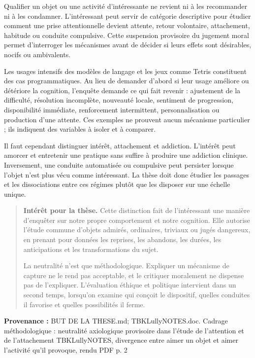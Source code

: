 \documentclass[10pt,a4paper]{article}
\begin{document}
Qualifier un objet ou une activité d'intéressante ne revient ni à les recommander ni à les condamner. L'intéressant peut servir de catégorie descriptive pour étudier comment une prise attentionnelle devient attente, retour volontaire, attachement, habitude ou conduite compulsive. Cette suspension provisoire du jugement moral permet d'interroger les mécanismes avant de décider si leurs effets sont désirables, nocifs ou ambivalents.

Les usages intensifs des modèles de langage et les jeux comme Tetris constituent des cas programmatiques. Au lieu de demander d'abord si leur usage améliore ou détériore la cognition, l'enquête demande ce qui fait revenir : ajustement de la difficulté, résolution incomplète, nouveauté locale, sentiment de progression, disponibilité immédiate, renforcement intermittent, personnalisation ou production d'une attente. Ces exemples ne prouvent aucun mécanisme particulier ; ils indiquent des variables à isoler et à comparer.

Il faut cependant distinguer intérêt, attachement et addiction. L'intérêt peut amorcer et entretenir une pratique sans suffire à produire une addiction clinique. Inversement, une conduite automatisée ou compulsive peut persister lorsque l'objet n'est plus vécu comme intéressant. La thèse doit donc étudier les passages et les dissociations entre ces régimes plutôt que les disposer sur une échelle unique.

\begin{quote}
\textbf{Intérêt pour la thèse.} Cette distinction fait de l'intéressant une manière d'enquêter sur notre propre comportement et notre cognition. Elle autorise l'étude commune d'objets admirés, ordinaires, triviaux ou jugés dangereux, en prenant pour données les reprises, les abandons, les durées, les anticipations et les transformations du sujet.

La neutralité n'est que méthodologique. Expliquer un mécanisme de capture ne le rend pas acceptable, et le critiquer moralement ne dispense pas de l'expliquer. L'évaluation éthique et politique intervient dans un second temps, lorsqu'on examine qui conçoit le dispositif, quelles conduites il favorise et quelles possibilités il ferme.
\end{quote}
{\footnotesize\color{metadata}\textbf{Provenance :} BUT DE LA THESE.md; TBKLullyNOTES.doc. Cadrage méthodologique : neutralité axiologique provisoire dans l'étude de l'attention et de l'attachement TBKLullyNOTES, divergence entre aimer un objet et aimer l'activité qu'il provoque, rendu PDF p. 2\par}
\end{document}
